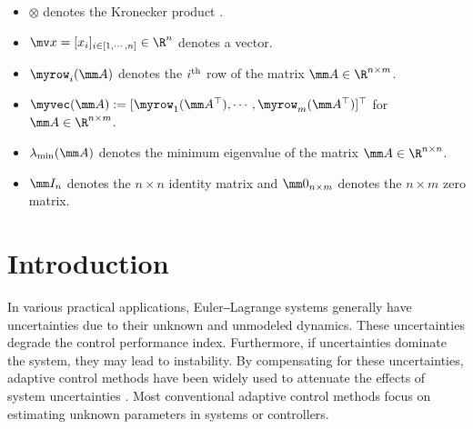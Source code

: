 \documentclass[letterpaper, 10 pt, conference]{ieeeconf}  %
\begin{document}
\begin{itemize}
    \item $\otimes$ denotes the Kronecker product \cite[Definition 7.1.2]{Bernstein:2009aa}.
    \item $\mv x=[x_i]_{i\in[1,\cdots,n]}\in\R^n$ denotes a vector.
    \item $\myrow_i(\mm A)$ denotes the $i\textsuperscript{th}$ row of the matrix $\mm A\in\R^{n\times m}$. 
    \item $\myvec(\mm A):= [\myrow_1(\mm A^\top)  ,\cdots,\myrow_m(\mm A^\top)  ]^\top   $ for $\mm A\in\R^{n\times m}$.
    \item $\lambda_\text{min}(\mm A)$ denotes the minimum eigenvalue of the matrix $\mm A\in\R^{n\times n}$.
    \item $\mm I_n$ denotes the $n\times n$ identity matrix and $\mm 0_{n\times m}$ denotes the $n\times m$ zero matrix.
\end{itemize}

\section{Introduction}

In various practical applications, Euler‒Lagrange systems generally have uncertainties due to their unknown and unmodeled dynamics.
These uncertainties degrade the control performance index.
Furthermore, if uncertainties dominate the system, they may lead to instability.
By compensating for these uncertainties, adaptive control methods have been widely used to attenuate the effects of system uncertainties \cite{Tao:2003aa,Ioannou:2006aa}.
Most conventional adaptive control methods focus on estimating unknown parameters in systems or controllers.
\end{document}
